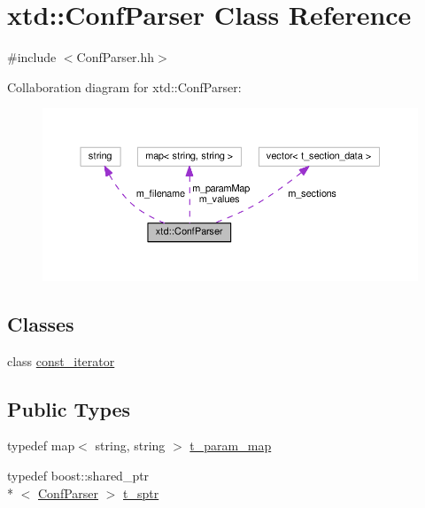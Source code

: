 \hypertarget{classxtd_1_1ConfParser}{\section{xtd\-:\-:Conf\-Parser Class Reference}
\label{classxtd_1_1ConfParser}
}


{\ttfamily \#include $<$Conf\-Parser.\-hh$>$}



Collaboration diagram for xtd\-:\-:Conf\-Parser\-:
\nopagebreak
\begin{figure}[H]
\begin{center}
\leavevmode
\includegraphics[width=350pt]{classxtd_1_1ConfParser__coll__graph}
\end{center}
\end{figure}
\subsection*{Classes}
\begin{DoxyCompactItemize}
\item 
class \hyperlink{classxtd_1_1ConfParser_1_1const__iterator}{const\-\_\-iterator}
\end{DoxyCompactItemize}
\subsection*{Public Types}
\begin{DoxyCompactItemize}
\item 
typedef map$<$ string, string $>$ \hyperlink{classxtd_1_1ConfParser_a715a3e39fd796046c94546e60f22414d}{t\-\_\-param\-\_\-map}
\item 
typedef boost\-::shared\-\_\-ptr\\*
$<$ \hyperlink{classxtd_1_1ConfParser}{Conf\-Parser} $>$ \hyperlink{classxtd_1_1ConfParser_ae1e724e304256650bac2e9b2d63a51df}{t\-\_\-sptr}
\end{DoxyCompactItemize}
